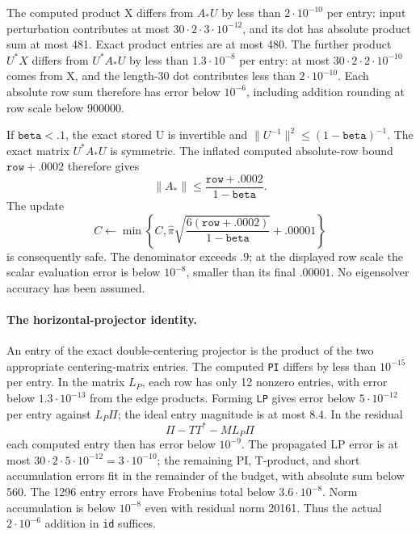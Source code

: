 The computed product X differs from $A_*U$ by less than
$2\cdot10^{-10}$ per entry: input perturbation contributes at most
$30\cdot2\cdot3\cdot10^{-12}$, and its dot has absolute product
sum at most 481.  Exact product entries are at most 480.  The further
product $U^*X$ differs from $U^*A_*U$ by less than
$1.3\cdot10^{-8}$ per entry: at most
$30\cdot2\cdot2\cdot10^{-10}$ comes from X, and the length-30
dot contributes less than $2\cdot10^{-10}$.
Each absolute row sum therefore has error below $10^{-6}$,
including addition rounding at row scale below $900000$.

If $\mathtt{beta}<.1$, the exact stored U is invertible and
$\|U^{-1}\|^2\le(1-\mathtt{beta})^{-1}$.
The exact matrix $U^*A_*U$ is symmetric.  The inflated computed
absolute-row bound $\mathtt{row}+.0002$ therefore gives
\[
 \|A_*\|\le
 \frac{\mathtt{row}+.0002}{1-\mathtt{beta}}.
\]
The update
\begin{equation}\label{round:tensor-c}
 C\leftarrow\min\left\{C,
  \widehat\pi\sqrt{\frac{6(\mathtt{row}+.0002)}
                              {1-\mathtt{beta}}}+.00001\right\}
\end{equation}
is consequently safe.  The denominator exceeds $.9$; at the displayed
row scale the scalar evaluation error is below $10^{-8}$, smaller
than its final $.00001$.  No eigensolver accuracy has been assumed.

\paragraph{The horizontal-projector identity.}
An entry of the exact double-centering projector is the product of
the two appropriate centering-matrix entries.  The computed
\texttt{PI} differs by less than $10^{-15}$ per entry.  In the
matrix $L_P$, each row has only 12 nonzero entries, with error below
$1.3\cdot10^{-13}$ from the edge products.  Forming
\texttt{LP} gives error below $5\cdot10^{-12}$ per entry against
$L_P\Pi$; the ideal entry magnitude is at most $8.4$.
In the residual
\[
 \Pi-TT^*-M L_P\Pi
\]
each computed entry then has error below $10^{-9}$.
The propagated LP error is at most
$30\cdot2\cdot5\cdot10^{-12}=3\cdot10^{-10}$;
the remaining PI, T-product, and short accumulation errors fit in
the remainder of the budget, with absolute sum below 560.
The 1296 entry errors have Frobenius total below $3.6\cdot10^{-8}$.
Norm accumulation is below $10^{-8}$ even with residual norm 20161.
Thus the actual $2\cdot10^{-6}$ addition in \texttt{id} suffices.

